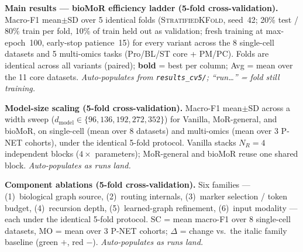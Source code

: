 \begin{table}[t]
\centering
{}
\caption{\textbf{Main results — bioMoR efficiency ladder (5-fold cross-validation).}
Macro-F1 mean$\pm$SD over 5 identical folds (\textsc{StratifiedKFold}, seed~42; 20\% test /
80\% train per fold, 10\% of train held out as validation; fresh training at max-epoch~100,
early-stop patience~15) for every variant across the 8 single-cell datasets and 5 multi-omics
tasks (Pro/BL/ST core + PM/PC). Folds are identical across all variants (paired); \textbf{bold}
= best per column; Avg = mean over the 11 core datasets. \emph{Auto-populates from
\texttt{results\_cv5/}; ``run\ldots'' = fold still training.}}
\label{tab:main_cv5}\label{tab:learned}\label{tab:ladder}
\end{table}

\begin{table}[t]
\centering
{}
\caption{\textbf{Model-size scaling (5-fold cross-validation).} Macro-F1 mean$\pm$SD across a
width sweep ($d_{\mathrm{model}}\in\{96,136,192,272,352\}$) for Vanilla, MoR-general, and
bioMoR, on single-cell (mean over 8 datasets) and multi-omics (mean over 3 P-NET cohorts),
under the identical 5-fold protocol. Vanilla stacks $N_R{=}4$ independent blocks ($4\times$
parameters); MoR-general and bioMoR reuse one shared block. \emph{Auto-populates as runs land.}}
\label{fig:scaling_cv5}
\end{table}

\begin{table}[t]
\centering
{}
\caption{\textbf{Component ablations (5-fold cross-validation).} Six families — (1)~biological
graph source, (2)~routing internals, (3)~marker selection / token budget, (4)~recursion depth,
(5)~learned-graph refinement, (6)~input modality — each under the identical 5-fold protocol.
SC = mean macro-F1 over 8 single-cell datasets, MO = mean over 3 P-NET cohorts; $\Delta$ = change
vs.\ the italic family baseline (green $+$, red $-$). \emph{Auto-populates as runs land.}}
\label{tab:ablation_cv5}\label{tab:confound}
\end{table}
